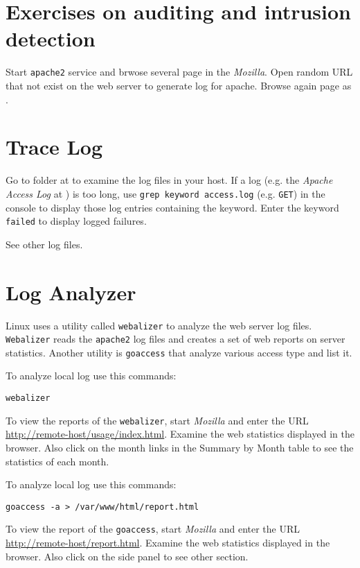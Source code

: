 \documentclass{../UTNetLab}
\begin{document}
\section*{Exercises on auditing and intrusion detection}
    Start \lstinline{apache2} service and brwose several page in the \textit{Mozilla}. Open random URL that not exist on the web server to generate log for apache. Browse again page as .

\section{Trace Log}
    Go to  folder at  to examine the log files in your host. If a log (e.g. the \textit{Apache Access Log} at ) is too long, use \lstinline[emph={keyword}]{grep keyword access.log} (e.g. \texttt{GET}) in the {console} to display those log entries containing the keyword. Enter the keyword \texttt{failed} to display logged failures.

    See other log files.

\section{Log Analyzer}
    Linux uses a utility called \lstinline{webalizer} to analyze the web server log files. \lstinline{Webalizer} reads the \lstinline{apache2} log files and creates a set of web reports on server statistics. Another utility is \lstinline{goaccess} that analyze various access type and list it.

    To analyze local log use this commands:
    \begin{lstlisting}
webalizer
    \end{lstlisting}
    
    To view the reports of the \lstinline{webalizer}, start \textit{Mozilla} and enter the URL \url{http://remote-host/usage/index.html}. Examine the web statistics displayed in the browser. Also click on the month links in the Summary by Month table to see the statistics of each month.

    To analyze local log use this commands:
    \begin{lstlisting}
goaccess -a > /var/www/html/report.html
    \end{lstlisting}
    
    To view the report of the \lstinline{goaccess}, start \textit{Mozilla} and enter the URL \url{http://remote-host/report.html}. Examine the web statistics displayed in the browser. Also click on the side panel to see other section.
\end{document}
